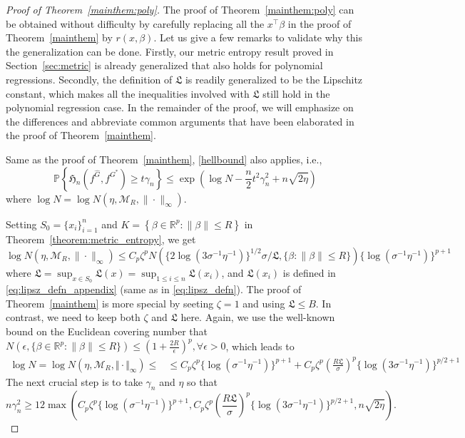 \documentclass[11pt]{article}
\numberwithin{equation}{section}
\newcommand{\T}{ \top }
\newcommand{\lipsz}{\mathfrak{L}}
\newcommand{\PP}{\mathbb{P}}
\begin{document}
\begin{appendices}
\begin{proof}[Proof of Theorem~\ref{mainthem:poly}]

The proof of Theorem~\ref{mainthem:poly} can be obtained without difficulty by carefully replacing all the $x^\T \beta$ in the proof of Theorem~\ref{mainthem} by $r(x,\beta)$. Let us give a few remarks to validate why this the generalization can be done. Firstly, our metric entropy result proved in Section~\ref{sec:metric} is already generalized that also holds for polynomial regressions. Secondly, the definition of $\lipsz$ is readily generalized to be the Lipschitz constant, which makes all the inequalities involved with $\lipsz$ still hold in the polynomial regression case. In the remainder of the proof, we will emphasize on the differences and abbreviate common arguments that have been elaborated in the proof of Theorem~\ref{mainthem}.

Same as the proof of Theorem~\ref{mainthem}, \eqref{hellbound} also applies, i.e., 
\[
\PP \left\{\mathfrak{H}_n(f^{\hat{G}}, f^{G^*}) \geq t \gamma_n \right\} \leq  \exp\left(\log N- \frac{n}{2} t^2\gamma_n^2 + n \sqrt{2 \eta}\right)
\]
where $\log N = \log N (\eta, \mathcal{M}_R, \| \cdot \|_{\infty})$.

Setting $S_0 = \{x_i\}_{i=1}^n$ and $K =  \left\{\beta \in \mathbb{R}^p : \|\beta\| \leq R \right\}$  in Theorem~\ref{theorem:metric_entropy}, we get 
\[
\log N(\eta, \mathcal{M}_R, \| \cdot \|_{\infty}) \leq C_p \zeta^p N(\{2 \log(3\sigma^{-1}\eta^{-1})\}^{1/2} \sigma/\lipsz,\{\beta : \|\beta\| \leq R \}) \{\log(\sigma^{-1}\eta^{-1})\}^{p+1}
\]
where $\lipsz = \sup_{x \in S_0} \lipsz(x) = \sup_{1\leq i \leq n} \lipsz(x_i)$, and $\lipsz(x_i)$ is defined in \eqref{eq:lipsz_defn_appendix}  (same as in \eqref{eq:lipsz_defn}). The proof of Theorem~\ref{mainthem} is more special by seeting $\zeta = 1$ and using $\lipsz \leq B$. In contrast, we need to keep both $\zeta$ and $\lipsz$ here. Again, we use the well-known bound on the Euclidean covering number that $\displaystyle N\left(\epsilon, \{\beta \in \mathbb{R}^p : \|\beta\| \leq R\} \right) \leq \left( 1+ \frac{2R}{\epsilon}  \right)^p , \forall \epsilon >0 $, which leads to 
\[
\begin{split}
\log N =  \log N(\eta, \mathcal{M}_R, \Vert \cdot \Vert_{\infty}) \leq 
  &\leq C_p \zeta^p \{\log(\sigma^{-1}\eta^{-1})\}^{p+1} + C_p \zeta^p\left(\frac{R\lipsz}{\sigma} \right)^p \{\log (3 \sigma^{-1} \eta^{-1}) \}^{p/2+1}
\end{split}
\]
The next crucial step is to take $\gamma_n$ and $\eta$ so that
\begin{equation}
 n \gamma_n^2 \geq 12 \max \left(C_p \zeta^p \{\log(\sigma^{-1}\eta^{-1})\}^{p+1}, C_p \zeta^p\left(\frac{R\lipsz}{\sigma} \right)^p \{\log (3 \sigma^{-1} \eta^{-1})  \}^{p/2+1}, n \sqrt{2 \eta} \right). 
 \label{eq:gamma_n_eq}
\end{equation}


\end{proof}
\end{appendices}
\end{document}
